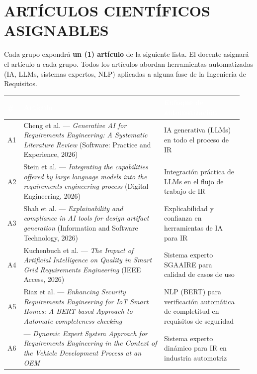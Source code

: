 \documentclass[11pt,a4paper]{article}
\newcommand{\hdark}[1]{\cellcolor{darkblue}\textbf{\textcolor{white}{\small #1}}}
\begin{document}
	\section{ARTÍCULOS CIENTÍFICOS ASIGNABLES}
	
	Cada grupo expondrá \textbf{un (1) artículo} de la siguiente lista. El docente asignará el artículo a cada grupo. Todos los artículos abordan herramientas automatizadas (IA, LLMs, sistemas expertos, NLP) aplicadas a alguna fase de la Ingeniería de Requisitos.
	
	\vspace{4pt}
	\noindent\begin{tabularx}{\linewidth}{|C{0.04\linewidth}|L{0.58\linewidth}|L{0.32\linewidth}|}
		\hline
		\hdark{\#} & \hdark{Artículo} & \hdark{Enfoque de automatización}\\
		\hline
		\small A1 & \small Cheng et al. --- \textit{Generative AI for Requirements Engineering: A Systematic Literature Review} (Software: Practice and Experience, 2026) & \small IA generativa (LLMs) en todo el proceso de IR\\
		\hline
		\small A2 & \small Stein et al. --- \textit{Integrating the capabilities offered by large language models into the requirements engineering process} (Digital Engineering, 2026) & \small Integración práctica de LLMs en el flujo de trabajo de IR\\
		\hline
		\small A3 & \small Shah et al. --- \textit{Explainability and compliance in AI tools for design artifact generation} (Information and Software Technology, 2026) & \small Explicabilidad y confianza en herramientas de IA para IR\\
		\hline
		\small A4 & \small Kuchenbuch et al. --- \textit{The Impact of Artificial Intelligence on Quality in Smart Grid Requirements Engineering} (IEEE Access, 2026) & \small Sistema experto SGAAIRE para calidad de casos de uso\\
		\hline
		\small A5 & \small Riaz et al. --- \textit{Enhancing Security Requirements Engineering for IoT Smart Homes: A BERT-based Approach to Automate completeness checking} & \small NLP (BERT) para verificación automática de completitud en requisitos de seguridad\\
		\hline
		\small A6 & \small --- \textit{Dynamic Expert System Approach for Requirements Engineering in the Context of the Vehicle Development Process at an OEM} & \small Sistema experto dinámico para IR en industria automotriz\\

\end{tabularx}
\end{document}
